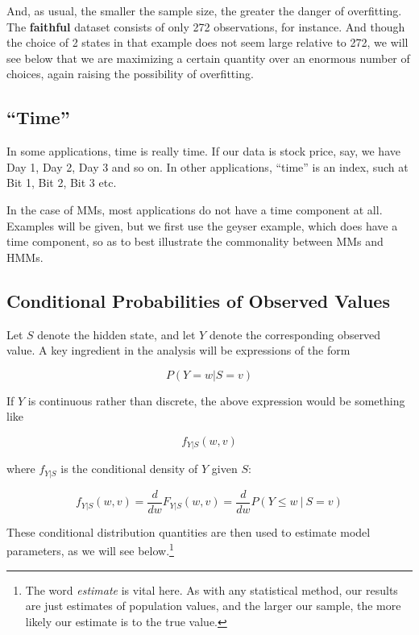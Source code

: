 \documentclass[11pt]{article}
\begin{document}
And, as usual, the smaller the sample size, the greater the danger of
overfitting.  The \textbf{faithful} dataset consists of only 272
observations, for instance.  And though the choice of 2 states in that
example does not seem large relative to 272, we will see below that we
are maximizing a certain quantity over an enormous number of choices,
again raising the possibility of overfitting.

\subsection{``Time''}

In some applications, time is really time.  If our data is stock price,
say, we have Day 1, Day 2, Day 3 and so on.  In other applications,
``time'' is an index, such at Bit 1, Bit 2, Bit 3 etc.

In the case of MMs, most applications do not have a time component at
all.  Examples will be given, but we first use the geyser example, which does
have a time component, so as to best illustrate the commonality between
MMs and HMMs.

\subsection{Conditional Probabilities of Observed Values}

Let $S$ denote the hidden state, and let $Y$ denote the corresponding
observed value.  A key ingredient in the analysis will be expressions of
the form

\begin{equation}
P(Y = w | S  = v)
\end{equation}

If $Y$ is continuous rather than discrete, the above expression would be
something like

\begin{equation}
f_{Y|S} (w,v) 
\end{equation}

where $f_{Y|S}$ is the conditional density of $Y$ given $S$:

\begin{equation}
f_{Y|S}(w,v) 
= \frac{d}{dw} F_{Y|S}(w,v) 
= \frac{d}{dw} P(Y \leq w ~|~ S = v)
\end{equation}

These conditional distribution quantities are then used to estimate
model parameters, as we will see below.\footnote{The word
\textit{estimate} is vital here.  As with any statistical method, our
results are just estimates of population values, and the larger our
sample, the more likely our estimate is to the true value.}
\end{document}
